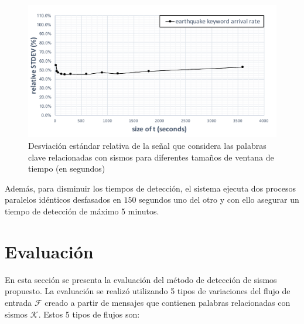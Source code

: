 	\begin{figure}[ht]
  	\centering
  	\includegraphics[trim={5 0 5 10}, clip, width=\textwidth]{imagenes/02_Poise_Analysis_WindowSize_solo.pdf}
  	\caption{Desviación estándar relativa de la señal que considera las palabras clave relacionadas con sismos para diferentes tamaños de ventana de tiempo (en segundos)}
	\label{fig:window_size}
	\end{figure}

	Además, para disminuir los tiempos de detección, el sistema ejecuta dos procesos paralelos idénticos desfasados en $150$ segundos uno del otro y con ello asegurar un tiempo de detección de máximo 5 minutos. 

		
\section{Evaluación}
\label{sec:evaluacion}

En esta sección se presenta la evaluación del método de detección de sismos propuesto. La evaluación se realizó utilizando 5 tipos de variaciones del flujo de entrada $\mathcal{F}$ creado a partir de mensajes que contienen palabras relacionadas con sismos $\mathcal{K}$. Estos 5 tipos de flujos son:

